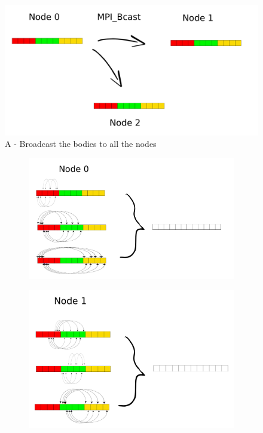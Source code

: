 \documentclass[a4paper]{article}
\begin{document}
\begin{figure}[ht]
  \centering
  \includegraphics[width=0.5\linewidth]{broadcast}
  \caption{A - Broadcast the bodies to all the nodes}
  \label{fig:A2}
\end{figure}
\FloatBarrier

\begin{figure}[ht]
\begin{subfigure}{.5\textwidth}
  \centering
  \includegraphics[width=1\linewidth]{force_calculation_0}
\end{subfigure} %
\begin{subfigure}{.5\textwidth}
  \centering
  \includegraphics[width=1\linewidth]{force_calculation_1}

\end{subfigure}
\end{figure}
\end{document}

